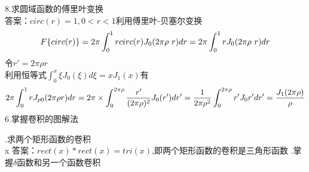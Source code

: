 \documentclass[UTF8]{ctexart}
\newcommand{\f}[2]{\frac{#1}{#2}}%
\begin{document}
8.求圆域函数的傅里叶变换\\
答案：$circ(r)=1,0<r<1$利用傅里叶-贝塞尔变换
\[ F\{circ(r)\}=2\pi\int_{0}^{1}rcirc(r)J_{0}(2\pi\rho\ r)dr
\\
=2\pi\int_{0}^{1}rJ_{0}(2\pi\rho\ r)dr
\]
令$r'=2\pi \rho r$\\
利用恒等式$\int_{0}^{x}\xi J_{0}(\xi)d\xi=xJ_{1}(x)$有
\[
    2\pi\int_{0}^{1}rJ_{p0}(2\pi\rho r)dr=2\pi\times\int_{0}^{2\pi\rho}\f{r'}{(2\pi\rho)^2}J_{0}(r')dr'
\\
=\f{1}{2\pi\rho^2}\int_{0}^{2\pi\rho}r'J_{0}r'dr'=\f{J_{1}(2\pi\rho)}{\rho}
\]
6.掌握卷积的图解法

.求两个矩形函数的卷积\\x
答案：$rect(x)*rect(x)=tri(x)$,即两个矩形函数的卷积是三角形函数
.掌握$\delta$函数和另一个函数卷积
\end{document}

